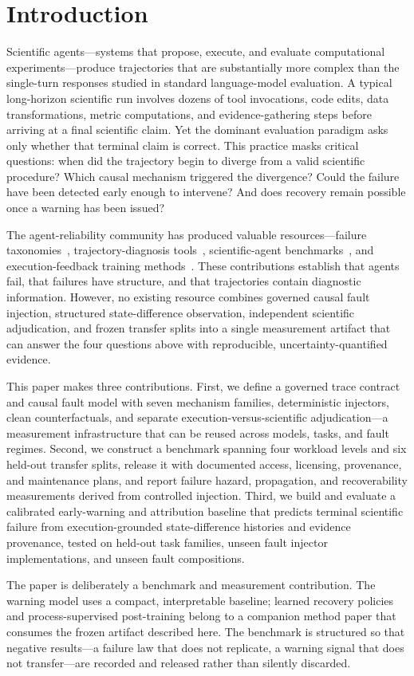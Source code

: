 \section{Introduction}
\label{sec:introduction}

Scientific agents—systems that propose, execute, and evaluate computational
experiments—produce trajectories that are substantially more complex than the
single-turn responses studied in standard language-model evaluation.
A typical long-horizon scientific run involves dozens of tool invocations,
code edits, data transformations, metric computations, and evidence-gathering
steps before arriving at a final scientific claim. Yet the dominant evaluation
paradigm asks only whether that terminal claim is correct. This practice
masks critical questions: when did the trajectory begin to diverge from a
valid scientific procedure? Which causal mechanism triggered the divergence?
Could the failure have been detected early enough to intervene? And does
recovery remain possible once a warning has been issued?

The agent-reliability community has produced valuable resources—failure
taxonomies~\citep{mast2025,aegis2025}, trajectory-diagnosis
tools~\citep{agentrx2026}, scientific-agent benchmarks~\citep{mlrbench2025,sciagentarena2026},
and execution-feedback training methods~\citep{capf2026,afterburner2025}.
These contributions establish that agents fail, that failures have structure,
and that trajectories contain diagnostic information. However, no existing
resource combines governed causal fault injection, structured
state-difference observation, independent scientific adjudication, and
frozen transfer splits into a single measurement artifact that can answer
the four questions above with reproducible, uncertainty-quantified evidence.

This paper makes three contributions. First, we define a governed trace
contract and causal fault model with seven mechanism families, deterministic
injectors, clean counterfactuals, and separate execution-versus-scientific
adjudication—a measurement infrastructure that can be reused across models,
tasks, and fault regimes. Second, we construct a benchmark spanning four
workload levels and six held-out transfer splits, release it with documented
access, licensing, provenance, and maintenance plans, and report failure
hazard, propagation, and recoverability measurements derived from controlled
injection. Third, we build and evaluate a calibrated early-warning and
attribution baseline that predicts terminal scientific failure from
execution-grounded state-difference histories and evidence provenance,
tested on held-out task families, unseen fault injector implementations,
and unseen fault compositions.

The paper is deliberately a benchmark and measurement contribution. The
warning model uses a compact, interpretable baseline; learned recovery
policies and process-supervised post-training belong to a companion method
paper that consumes the frozen artifact described here. The benchmark is
structured so that negative results—a failure law that does not replicate,
a warning signal that does not transfer—are recorded and released rather
than silently discarded.
